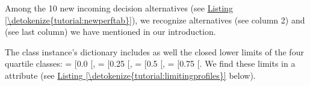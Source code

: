 \documentclass[a4paper,12pt,english]{sphinxhowto}
\begin{document}
Among the 10 new incoming decision alternatives (see \hyperref[\detokenize{tutorial:newperftab}]{Listing \ref{\detokenize{tutorial:newperftab}}}), we recognize alternatives  (see column 2) and  (see last column) we have mentioned in our introduction.

The  class instance’s  dictionary includes as well the closed lower limits of the four quartile classes:  = {[}0.0\sphinxhyphen{} {[},  = {[}0.25\sphinxhyphen{} {[},  = {[}0.5\sphinxhyphen{} {[},  = {[}0.75 \sphinxhyphen{} {[}. We find these limits in a  attribute (see \hyperref[\detokenize{tutorial:limitingprofiles}]{Listing \ref{\detokenize{tutorial:limitingprofiles}}} below).
\def\sphinxLiteralBlockLabel{\label{\detokenize{tutorial:limitingprofiles}}}
\begin{sphinxVerbatim}[commandchars=\\\{\},numbers=left,firstnumber=1,stepnumber=1]
\end{sphinxVerbatim}
\end{document}
